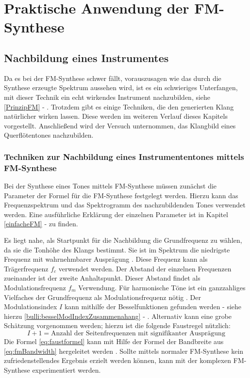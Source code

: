 \section{Praktische Anwendung der FM-Synthese}
\FloatBarrier
\subsection{Nachbildung eines Instrumentes}
Da es bei der FM-Synthese schwer fällt, vorauszusagen wie das durch die Synthese erzeugte Spektrum aussehen wird, ist es ein schwieriges Unterfangen, mit dieser Technik ein echt wirkendes Instrument nachzubilden, siehe \ref{PrinzipFM} - .
Trotzdem gibt es einige Techniken, die den generierten Klang natürlicher wirken lassen. Diese werden im weiteren Verlauf dieses Kapitels vorgestellt. Anschließend wird der Versuch unternommen, das Klangbild eines Querflötentones nachzubilden.

\FloatBarrier
\subsubsection{Techniken zur Nachbildung eines Instrumententones mittels FM-Synthese}

Bei der Synthese eines Tones mittels FM-Synthese müssen zunächst die Parameter der Formel für die FM-Synthese festgelegt werden. Hierzu kann das Frequenzspektrum und das Spektrogramm des nachzubildenden Tones verwendet werden. Eine ausführliche Erklärung der einzelnen Parameter ist in Kapitel \ref{einfacheFM} -  zu finden. 

Es liegt nahe, als Startpunkt für die Nachbildung die Grundfrequenz zu wählen, da sie die Tonhöhe des Klangs bestimmt. Sie ist im Spektrum die niedrigste Frequenz mit wahrnehmbarer Ausprägung \cite[S. 53]{barkowsky}. Diese Frequenz kann als Trägerfrequenz $f_c$ verwendet werden. Der Abstand der einzelnen Frequenzen zueinander ist der zweite Anhaltspunkt. Dieser Abstand findet als Modulationsfrequenz $f_m$ Verwendung. Für harmonische Töne ist ein ganzzahliges Vielfaches der Grundfrequenz als Modulationsfrequenz nötig \cite[S. 528]{chowningPaper}. Der Modulationsindex $I$ kann mithilfe der Besselfunktionen gefunden werden - siehe hierzu \ref{bulli:besselModIndexZusammenahang} - . Alternativ kann eine grobe Schätzung vorgenommen werden; hierzu ist die folgende Faustregel nützlich:
\begin{equation}
\label{eq:faustformel}
I + 1 = \text{Anzahl der Seitenfrequenzen mit signifikanter Ausprägung}
\end{equation}
Die Formel \ref{eq:faustformel} kann mit Hilfe der Formel der Bandbreite aus \ref{eq:fmBandwidth} hergeleitet werden \cite[S. 221]{lathi}. Sollte mittels normaler FM-Synthese kein zufriedenstellendes Ergebnis erzielt werden können, kann mit der komplexen FM-Synthese experimentiert werden. 

